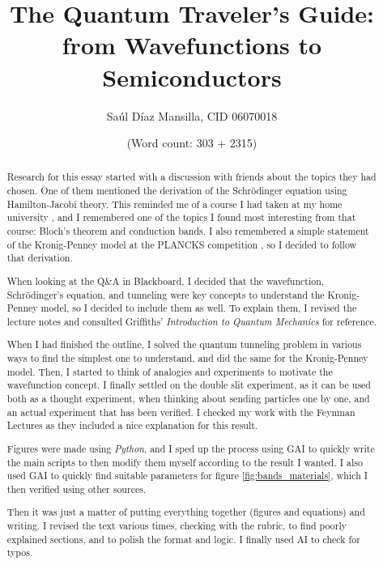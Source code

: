 \documentclass{article}
\title{The Quantum Traveler's Guide: from Wavefunctions to Semiconductors}
\author{Saúl Díaz Mansilla, CID 06070018}
\date{\small (Word count: 303 + 2315)}
\begin{document}
\maketitle

\begin{abstract}
    Research for this essay started with a discussion with friends about the topics they had chosen. One of them mentioned the derivation of the Schrödinger equation using Hamilton-Jacobi theory. This reminded me of a course I had taken at my home university \cite{sabiovera2024}, and I remembered one of the topics I found most interesting from that course: Bloch's theorem and conduction bands. I also remembered a simple statement of the Kronig-Penney model at the PLANCKS competition \cite{plancks2025solutions}, so I decided to follow that derivation.

    When looking at the Q\&A in Blackboard, I decided that the wavefunction, Schrödinger's equation, and tunneling were key concepts to understand the Kronig-Penney model, so I decided to include them as well. To explain them, I revised the lecture notes \cite{foulkes_notes} and consulted Griffiths' \textit{Introduction to Quantum Mechanics} \cite{griffiths2018} for reference.

    When I had finished the outline, I solved the quantum tunneling problem in various ways to find the simplest one to understand, and did the same for the Kronig-Penney model. Then, I started to think of analogies and experiments to motivate the wavefunction concept. I finally settled on the double slit experiment, as it can be used both as a thought experiment, when thinking about sending particles one by one, and an actual experiment that has been verified. I checked my work with the Feynman Lectures\cite{feynman1965lectures} as they included a nice explanation for this result.

    Figures were made using \textit{Python}, and I sped up the process using GAI to quickly write the main scripts to then modify them myself according to the result I wanted. I also used GAI to quickly find suitable parameters for figure \ref{fig:bands_materials}, which I then verified using other sources.

    Then it was just a matter of putting everything together (figures and equations) and writing. I revised the text various times, checking with the rubric, to find poorly explained sections, and to polish the format and logic. I finally used AI to check for typos.

\end{abstract}
\end{document}
